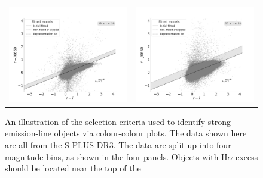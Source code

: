 \documentclass[fleqn,usenatbib]{mnras}
\begin{document}
\begin{figure}
\begin{tabular}{ll}
    \includegraphics[trim=10 0 65 20, clip]{Figs/diagram-DR3-errorFlag0-3f-18r20}
    & \includegraphics[trim=10 0 65 20, clip]{Figs/diagram-DR3-errorFlag0-3f-20r21}\\
  \end{tabular}
  \caption{An illustration of the selection criteria used to identify strong
    emission-line objects via colour-colour plots. The data shown here are all from the
    S-PLUS DR3. The data are split up into four magnitude bins, as shown in the four
    panels. Objects with H{$\alpha$} excess should be located near the top of the
}
\end{figure}
\end{document}
